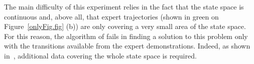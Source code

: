 \documentclass{article}
\begin{document}
The main difficulty of this experiment relies in the fact that the
state space is continuous and, above all, that expert trajectories
(shown in green on Figure~\ref{onlyFig.fig} (b)) are only covering a
very small area of the state space.
%
For this reason, the algorithm of \citet{abbeel2004apprenticeship}
fails in finding a solution to this problem only with the
transitions available from the expert demonstrations. Indeed, as
shown in~\citep{klein2011batch}, additional data covering the whole
state space is required.
%
\end{document}
